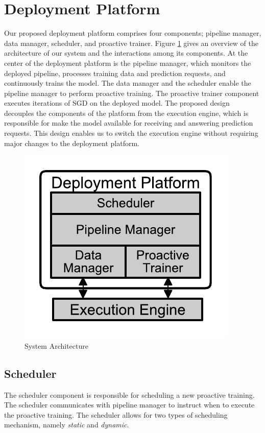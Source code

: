 \section{Deployment Platform} \label{sec:system-architecture}
Our proposed deployment platform comprises four components; pipeline manager, data manager, scheduler, and proactive trainer.
Figure \ref{fig:system-architecture} gives an overview of the architecture of our system and the interactions among its components.
At the center of the deployment platform is the pipeline manager, which monitors the deployed pipeline, processes training data and prediction requests, and continuously trains the model.
The data manager and the scheduler enable the pipeline manager to perform proactive training.
The proactive trainer component executes iterations of SGD on the deployed model.
The proposed design decouples the components of the platform from the execution engine, which is responsible for make the model available for receiving and answering prediction requests.
This design enables us to switch the execution engine without requiring major changes to the deployment platform.
\begin{figure}[t]
\centering
\includegraphics[width=0.8\columnwidth]{../images/system-architecture.pdf}
\caption{System Architecture}
\label{fig:system-architecture}
\end{figure}

\subsection{Scheduler}\label{scheduler}
The scheduler component is responsible for scheduling a new proactive training.
The scheduler communicates with pipeline manager to instruct when to execute the proactive training.
The scheduler allows for two types of scheduling mechanism, namely \textit{static} and \textit{dynamic}.

